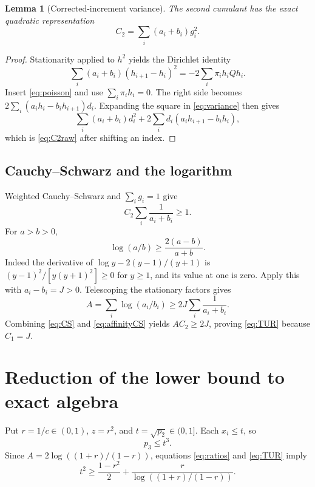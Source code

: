 \documentclass[11pt,a4paper]{article}
\numberwithin{equation}{section}
\newtheorem{lemma}[theorem]{Lemma}
\theoremstyle{remark}
\begin{document}
\begin{lemma}[Corrected-increment variance]\label{lem:variance}
The second cumulant has the exact quadratic representation
\begin{equation}\label{eq:variance}
  C_2=\sum_i(a_i+b_i)g_i^2.
\end{equation}
\end{lemma}
\begin{proof}
Stationarity applied to $h^2$ yields the Dirichlet identity
\[
 \sum_i(a_i+b_i)(h_{i+1}-h_i)^2
   =-2\sum_i\pi_i h_iQh_i.
\]
Insert \eqref{eq:poisson} and use $\sum_i\pi_i h_i=0$. The right side becomes
$2\sum_i(a_i h_i-b_i h_{i+1})d_i$. Expanding the square in
\eqref{eq:variance} then gives
\[
 \sum_i(a_i+b_i)d_i^2
 +2\sum_i d_i(a_i h_{i+1}-b_i h_i),
\]
which is \eqref{eq:C2raw} after shifting an index.
\end{proof}

\subsection{Cauchy--Schwarz and the logarithm}
Weighted Cauchy--Schwarz and $\sum_i g_i=1$ give
\begin{equation}\label{eq:CS}
  C_2\sum_i\frac1{a_i+b_i}\ge1.
\end{equation}
For $a>b>0$,
\[
  \log(a/b)\ge\frac{2(a-b)}{a+b}.
\]
Indeed the derivative of $\log y-2(y-1)/(y+1)$ is
$(y-1)^2/[y(y+1)^2]\ge0$ for $y\ge1$, and its value at one is zero.
Apply this with $a_i-b_i=J>0$. Telescoping the stationary factors gives
\begin{equation}\label{eq:affinityCS}
 A=\sum_i\log(a_i/b_i)
   \ge2J\sum_i\frac1{a_i+b_i}.
\end{equation}
Combining \eqref{eq:CS} and \eqref{eq:affinityCS} yields
$AC_2\ge2J$, proving \eqref{eq:TUR} because $C_1=J$.

\section{Reduction of the lower bound to exact algebra}\label{sec:lower}

Put $r=1/c\in(0,1)$, $z=r^2$, and $t=\sqrt{p_2}\in(0,1]$.
Each $x_i\le t$, so
\begin{equation}\label{eq:momentbound}
  p_3\le t^3.
\end{equation}
Since $A=2\log((1+r)/(1-r))$, equations \eqref{eq:ratios} and
\eqref{eq:TUR} imply
\begin{equation}\label{eq:momentTUR}
  t^2\ge\frac{1-r^2}{2}
       +\frac{r}{\log((1+r)/(1-r))}.
\end{equation}
\end{document}
